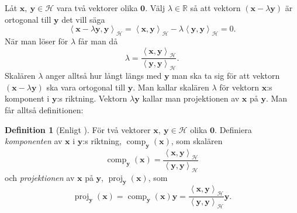 \documentclass[a4paper, 12pt]{report}
\theoremstyle{definition}
\newtheorem{defi}{Definition}[section]
\theoremstyle{remark}
\newcommand{\bfx}{\mathbf{x}}
\newcommand{\bfy}{\mathbf{y}}
\newcommand{\llangle}{\left\langle}
\newcommand{\rrangle}{\right\rangle}
\newcommand{\inner}[2]{\llangle #1, #2 \rrangle}
\newcommand{\hil}{\mathcal{H}}
\begin{document}
Låt $\bfx,~\bfy\in\hil$ vara två vektorer olika $\mathbf{0}$. Välj $\lambda\in\mathbb{R}$ så att vektorn $\left(\bfx-\lambda\bfy \right)$ är ortogonal till $\bfy$ det vill säga
\begin{equation*}
	\inner{\bfx-\lambda\bfy}{\bfy}_\hil=\inner{\bfx}{\bfy}_\hil-\lambda\inner{\bfy}{\bfy}_\hil=0.
\end{equation*}
När man löser för $\lambda$ får man då
\begin{equation*}
	\lambda=\frac{\inner{\bfx}{\bfy}_\hil}{\inner{\bfy}{\bfy}_\hil}.
\end{equation*}
Skalären $\lambda$ anger alltså hur långt längs med $\bfy$ man ska ta sig för att vektorn $\left(\bfx-\lambda\bfy\right)$ ska vara ortogonal till $\bfy$.
Man kallar skalären $\lambda$ för vektorn $\bfx$:s komponent i $\bfy$:s riktning.
Vektorn $\lambda\bfy$ kallar man projektionen av $\bfx$ på $\bfy$.
Man får alltså definitionen:
\begin{defi}[Enligt \cite{Lang}]
	För två vektorer $\bfx,~\bfy\in\mathcal{H}$ olika $\mathbf{0}$. Definiera \emph{komponenten} av $\bfx$ i $\bfy$:s riktning, $\operatorname{comp}_\bfy\left(\bfx\right)$, som skalären 
	\begin{equation*}
		\operatorname{comp}_\bfy\left(\bfx\right)=\frac{\inner{\bfx}{\bfy}_\hil}{\inner{\bfy}{\bfy}_\hil}
	\end{equation*}
	och \emph{projektionen} av $\bfx$ på $\bfy$, $\operatorname{proj}_\bfy\left(\bfx\right)$, som
	\begin{equation*}
		\operatorname{proj}_\bfy\left(\bfx\right)=\operatorname{comp}_\bfy\left(\bfx\right)\bfy=\frac{\inner{\bfx}{\bfy}_\hil}{\inner{\bfy}{\bfy}_\hil}\bfy.
	\end{equation*}
\end{defi}
\end{document}
